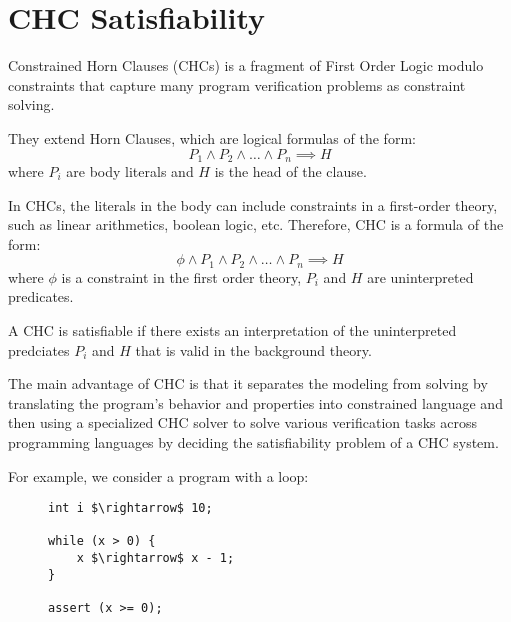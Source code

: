 \section{CHC Satisfiability}
\noindent Constrained Horn Clauses (CHCs)\cite{10.1007/978-3-031-13185-1_2} is a fragment of First Order Logic
modulo constraints that capture many program verification problems as
constraint solving.

\vspace{\baselineskip}\noindent
They extend Horn Clauses, which are logical formulas of the form:
\begin{equation*}
    P_{1} \land P_{2} \land \dots \land P_{n} \implies H
\end{equation*}
where $P_i$ are body literals and $H$ is the head of the clause.

\vspace{\baselineskip}
In CHCs, the literals in the body can include constraints in a first-order theory, such as linear arithmetics, boolean logic, etc.
Therefore, CHC is a formula of the form:
\begin{equation*}
    \phi \land P_{1} \land P_{2} \land \dots \land P_{n} \implies H
\end{equation*}
where $\phi$ is a constraint in the first order theory, $P_i$ and $H$ are uninterpreted predicates.

\vspace{\baselineskip}\noindent
A CHC is satisfiable if there exists an interpretation of the uninterpreted predciates $P_i$ and $H$ that is valid in the background theory.

The main advantage of CHC is that it separates the modeling
from solving by translating the program’s behavior and properties into
constrained language and then using a specialized CHC solver to solve various
verification tasks across programming languages by deciding the satisfiability
problem of a CHC system.

\vspace{\baselineskip}\noindent
For example, we consider a program with a loop:
\vspace{\baselineskip}
\begin{figure}[h]
    \begin{mdframed}
        \begin{lstlisting}
int i $\rightarrow$ 10;

while (x > 0) {
    x $\rightarrow$ x - 1;
}

assert (x >= 0);
        \end{lstlisting}
    \end{mdframed}
\end{figure}

